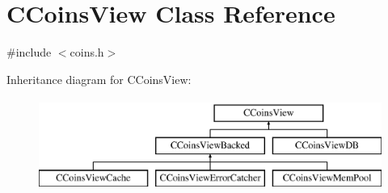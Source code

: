 \hypertarget{class_c_coins_view}{}\section{C\+Coins\+View Class Reference}
\label{class_c_coins_view}


{\ttfamily \#include $<$coins.\+h$>$}

Inheritance diagram for C\+Coins\+View\+:\begin{figure}[H]
\begin{center}
\leavevmode
\includegraphics[height=3.000000cm]{class_c_coins_view}
\end{center}
\end{figure}
